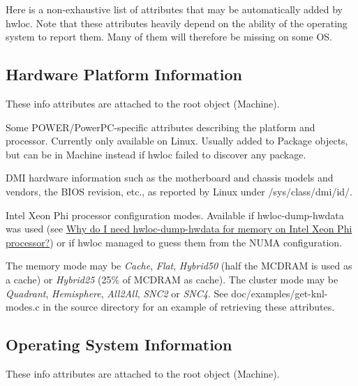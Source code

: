 Here is a non-\/exhaustive list of attributes that may be automatically added by hwloc. Note that these attributes heavily depend on the ability of the operating system to report them. Many of them will therefore be missing on some OS.

 \hypertarget{a00386_attributes_info_platform}{}\subsection{Hardware Platform Information}\label{a00386_attributes_info_platform}
These info attributes are attached to the root object (Machine).


\begin{DoxyDescription}
\item[Platform\+Name, Platform\+Model, Platform\+Vendor, Platform\+Board\+ID, Platform\+Revision, ]
\item[System\+Version\+Register, Processor\+Version\+Register (Machine) ]Some P\+O\+W\+E\+R/\+Power\+P\+C-\/specific attributes describing the platform and processor. Currently only available on Linux. Usually added to Package objects, but can be in Machine instead if hwloc failed to discover any package.  
\item[D\+M\+I\+Board\+Vendor, D\+M\+I\+Board\+Name, etc. ]D\+MI hardware information such as the motherboard and chassis models and vendors, the B\+I\+OS revision, etc., as reported by Linux under {\ttfamily /sys/class/dmi/id/}.  
\item[Memory\+Mode, Cluster\+Mode ]Intel Xeon Phi processor configuration modes. Available if hwloc-\/dump-\/hwdata was used (see \hyperlink{a00394_faq_knl_dump}{Why do I need hwloc-\/dump-\/hwdata for memory on Intel Xeon Phi processor?}) or if hwloc managed to guess them from the N\+U\+MA configuration.

The memory mode may be {\itshape Cache}, {\itshape Flat}, {\itshape Hybrid50} (half the M\+C\+D\+R\+AM is used as a cache) or {\itshape Hybrid25} (25\% of M\+C\+D\+R\+AM as cache). The cluster mode may be {\itshape Quadrant}, {\itshape Hemisphere}, {\itshape All2\+All}, {\itshape S\+N\+C2} or {\itshape S\+N\+C4}. See doc/examples/get-\/knl-\/modes.\+c in the source directory for an example of retrieving these attributes.  
\end{DoxyDescription}

 \hypertarget{a00386_attributes_info_os}{}\subsection{Operating System Information}\label{a00386_attributes_info_os}
These info attributes are attached to the root object (Machine).


